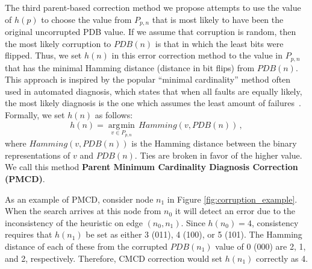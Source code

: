 \documentclass[letterpaper]{article}
\DeclareMathOperator*{\argmin}{\arg\!\min}
\begin{document}


The third parent-based correction method we propose attempts to use the value of $h(p)$ to choose the value from $P_{p,n}$ that is most likely to have been the original uncorrupted PDB value. If we assume that corruption is random, then the most likely corruption to $PDB(n)$ is that in which the least bits were flipped. Thus, we set $h(n)$ in this error correction method to the value in $P_{p,n}$ that has the minimal Hamming distance (distance in bit flips) from $PDB(n)$. 
This approach is inspired by the popular ``minimal cardinality'' method often used in automated diagnosis, which states that when all faults are equally likely, the most likely diagnosis is the one which assumes the least amount of failures~\cite{de1987diagnosing}.
Formally, we set $h(n)$ as follows:
\begin{equation}
h(n) = \underset{v \in P_{p,n}}{\argmin} \, Hamming(v, PDB(n)) \,,
\end{equation}
\noindent
where $Hamming(v, PDB(n))$ is the Hamming distance between the binary representations of $v$ and $PDB(n)$. Ties are broken in favor of the higher value. 
We call this method \textbf{Parent Minimum Cardinality Diagnosis Correction (PMCD)}.

As an example of PMCD, consider node $n_1$ in Figure \ref{fig:corruption_example}. When the search arrives at this node from $n_0$ it will detect an error due to the inconsistency of the heuristic on edge $(n_0, n_1)$.
Since $h(n_0)=4$, consistency requires that $h(n_1)$ be set as either 3 (011), 4 (100), or 5 (101). The Hamming distance of each of these from the corrupted $PDB(n_1)$ value of 0 (000) are 2, 1, and 2, respectively.
Therefore, CMCD correction would set $h(n_1)$ correctly as 4.
\end{document}
